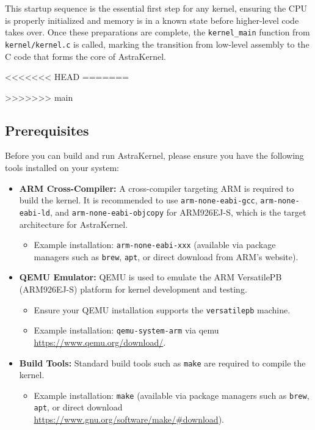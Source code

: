 This startup sequence is the essential first step for any kernel, ensuring the 
CPU is properly initialized and memory is in a known state before higher-level 
code takes over. Once these preparations are complete, the \texttt{kernel\_main} 
function from \texttt{kernel/kernel.c} is called, marking the transition from 
low-level assembly to the C code that forms the core of AstraKernel.

<<<<<<< HEAD
=======

>>>>>>> main
\subsection{Prerequisites}

Before you can build and run AstraKernel, please ensure you have the following 
tools installed on your system:

\begin{itemize}
  \item \textbf{ARM Cross-Compiler:}  
  A cross-compiler targeting ARM is required to build the kernel. It 
  is recommended to use \texttt{arm-none-eabi-gcc}, \texttt{arm-none-eabi-ld}, 
  and \texttt{arm-none-eabi-objcopy} for ARM926EJ-S, which is the target architecture
  for AstraKernel.
  \begin{itemize}
    \item Example installation: \texttt{arm-none-eabi-xxx} (available via package 
    managers such as \texttt{brew}, \texttt{apt}, or direct download from ARM's website).
  \end{itemize}
  
  \item \textbf{QEMU Emulator:}  
  QEMU is used to emulate the ARM VersatilePB (ARM926EJ-S) platform for kernel development and testing.
  \begin{itemize}
    \item Ensure your QEMU installation supports the \texttt{versatilepb} machine.
    \item Example installation: \texttt{qemu-system-arm} via  qemu \url{https://www.qemu.org/download/}.
  \end{itemize}

  \item \textbf{Build Tools:}  
  Standard build tools such as \texttt{make} are required to compile the kernel.
  \begin{itemize}
    \item Example installation: \texttt{make} (available via package managers 
    such as \texttt{brew}, \texttt{apt}, or direct download \url{https://www.gnu.org/software/make/#download}).
  \end{itemize}
\end{itemize}

